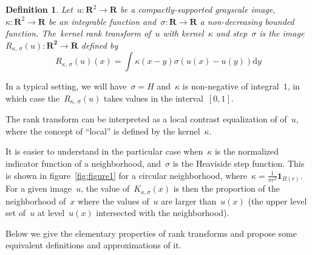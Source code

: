 \documentclass[12pt]{article}                  %
\newtheorem{definition}{Definition}
\def\parens#1{\left(#1\right)}
\begin{document}
\begin{definition}
Let~$u:\mathbf{R}^2\to\mathbf{R}$ be a compactly-supported grayscale image,
$\kappa:\mathbf{R}^2\to\mathbf{R}$ be an integrable function
and~$\sigma:\mathbf{R}\to\mathbf{R}$ a non-decreasing bounded
function.  The~\emph{kernel rank transform of~$u$ with kernel~$\kappa$ and
step~$\sigma$} is the
image~$R_{\kappa,\,\sigma}(u):\mathbf{R^2}\to\mathbf{R}$ defined by
\begin{equation}\label{eq:rtdef}
	R_{\kappa,\,\sigma}(u)(x) = \int\kappa(x-y)\sigma\parens{u(x)-u(y)}\mathrm{d}y
\end{equation}
\end{definition}
In a typical setting, we will have~$\sigma=H$ and~$\kappa$ is non-negative of
integral~$1$, in which
case the~$R_{\kappa,\,\sigma}(u)$ takes values in the
interval~$[0,1]$.

The rank transform can be interpreted as a local contrast equalization of
of~$u$, where the concept of ``local'' is defined by the kernel~$\kappa$.

It is easier to understand in the particular case
when~$\kappa$ %
is the normalized
indicator function of a neighborhood, and~$\sigma$ is the Heaviside step
function.  This is shown in figure~\ref{fig:figure1} for a circular
neighborhood, where~$\kappa=\frac1{\pi r^2}\mathbf{1}_{B(r)}$.
For a given image~$u$,
the value of~$K_{\kappa,\sigma}(x)$ is then the proportion of the
neighborhood of~$x$ where the values of~$u$ are larger than~$u(x)$ (the
upper level set of~$u$ at level~$u(x)$ intersected with the neighborhood).



Below we give the elementary properties of rank transforms and propose some
equivalent definitions and approximations of it.
\end{document}
